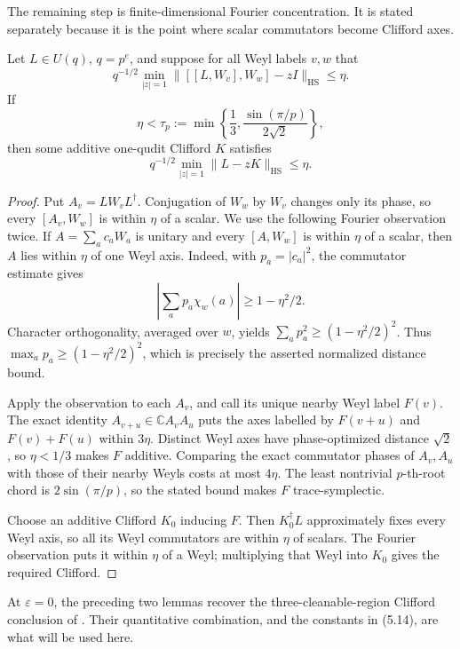 The remaining step is finite-dimensional Fourier concentration.  It is
stated separately because it is the point where scalar commutators become
Clifford axes.

\begin{lemma}
\label{lem:nested-weyl-rounding}
Let \(L\in U(q)\), \(q=p^e\), and suppose for all Weyl labels \(v,w\)
that
\[
 q^{-1/2}\min_{|z|=1}
 \lVert [[L,W_v],W_w]-zI\rVert_{\mathrm{HS}}\leq\eta.
\]
If
\[
 \eta<\tau_p:=\min\left\{\frac13,
       \frac{\sin(\pi/p)}{2\sqrt2}\right\},
\]
then some additive one-qudit Clifford \(K\) satisfies
\[
 q^{-1/2}\min_{|z|=1}\lVert L-zK\rVert_{\mathrm{HS}}\leq\eta.
\]
\end{lemma}

\begin{proof}
Put \(A_v=LW_vL^\dagger\).  Conjugation of \(W_w\) by \(W_v\) changes
only its phase, so every \([A_v,W_w]\) is within \(\eta\) of a scalar.
We use the following Fourier observation twice.  If
\(A=\sum_a c_aW_a\) is unitary and every \([A,W_w]\) is within \(\eta\)
of a scalar, then \(A\) lies within \(\eta\) of one Weyl axis.  Indeed,
with \(p_a=|c_a|^2\), the commutator estimate gives
\[
 \left|\sum_a p_a\chi_w(a)\right|\geq1-\eta^2/2.
\]
Character orthogonality, averaged over \(w\), yields
\(\sum_ap_a^2\geq(1-\eta^2/2)^2\).  Thus
\(\max_ap_a\geq(1-\eta^2/2)^2\), which is precisely the asserted
normalized distance bound.

Apply the observation to each \(A_v\), and call its unique nearby Weyl
label \(F(v)\).  The exact identity
\(A_{v+u}\in\mathbb C A_vA_u\) puts the axes labelled by \(F(v+u)\) and
\(F(v)+F(u)\) within \(3\eta\).  Distinct Weyl axes have phase-optimized
distance \(\sqrt2\), so \(\eta<1/3\) makes \(F\) additive.  Comparing
the exact commutator phases of \(A_v,A_u\) with those of their nearby
Weyls costs at most \(4\eta\).  The least nontrivial \(p\)-th-root chord
is \(2\sin(\pi/p)\), so the stated bound makes \(F\) trace-symplectic.

Choose an additive Clifford \(K_0\) inducing \(F\).  Then
\(K_0^\dagger L\) approximately fixes every Weyl axis, so all its Weyl
commutators are within \(\eta\) of scalars.  The Fourier observation puts
it within \(\eta\) of a Weyl; multiplying that Weyl into \(K_0\) gives
the required Clifford.
\end{proof}

At \(\varepsilon=0\), the preceding two lemmas recover the
three-cleanable-region Clifford conclusion of
\cite[Lemma~5]{PastawskiYoshida2015}.  Their quantitative combination, and
the constants in (5.14), are what will be used here.

